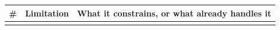 \documentclass[authoryear,review,3p,times]{elsarticle}
\newcounter{none}
\begin{document}
{\def\LTcaptype{none} %
\small
\begin{longtable}[]{@{}
  >{\raggedright\arraybackslash}p{}
  >{\raggedright\arraybackslash}p{}
  >{\raggedright\arraybackslash}p{}@{}}
\toprule\noalign{}
\begin{minipage}[b]{\linewidth}\raggedright
\#
\end{minipage} & \begin{minipage}[b]{\linewidth}\raggedright
Limitation
\end{minipage} & \begin{minipage}[b]{\linewidth}\raggedright
What it constrains, or what already handles it
\end{minipage} \\
\midrule\noalign{}

\bottomrule\noalign{}


\end{longtable}}
\end{document}
